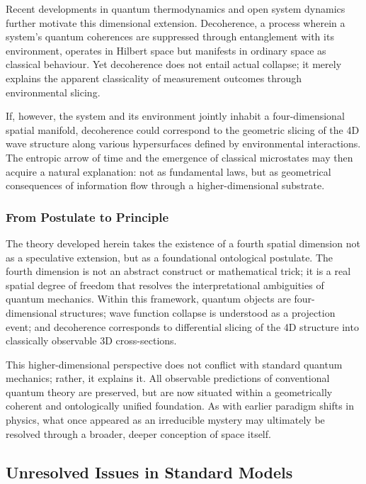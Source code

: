\documentclass[12pt]{article}
\begin{document}
Recent developments in quantum thermodynamics and open system dynamics further motivate this dimensional extension. Decoherence, a process wherein a system’s quantum coherences are suppressed through entanglement with its environment, operates in Hilbert space but manifests in ordinary space as classical behaviour. Yet decoherence does not entail actual collapse; it merely explains the apparent classicality of measurement outcomes through environmental slicing.

If, however, the system and its environment jointly inhabit a four-dimensional spatial manifold, decoherence could correspond to the geometric slicing of the 4D wave structure along various hypersurfaces defined by environmental interactions. The entropic arrow of time and the emergence of classical microstates may then acquire a natural explanation: not as fundamental laws, but as geometrical consequences of information flow through a higher-dimensional substrate.

\subsubsection*{From Postulate to Principle}

The theory developed herein takes the existence of a fourth spatial dimension not as a speculative extension, but as a foundational ontological postulate. The fourth dimension is not an abstract construct or mathematical trick; it is a real spatial degree of freedom that resolves the interpretational ambiguities of quantum mechanics. Within this framework, quantum objects are four-dimensional structures; wave function collapse is understood as a projection event; and decoherence corresponds to differential slicing of the 4D structure into classically observable 3D cross-sections.

This higher-dimensional perspective does not conflict with standard quantum mechanics; rather, it explains it. All observable predictions of conventional quantum theory are preserved, but are now situated within a geometrically coherent and ontologically unified foundation. As with earlier paradigm shifts in physics, what once appeared as an irreducible mystery may ultimately be resolved through a broader, deeper conception of space itself.


\subsection{Unresolved Issues in Standard Models}
\end{document}
